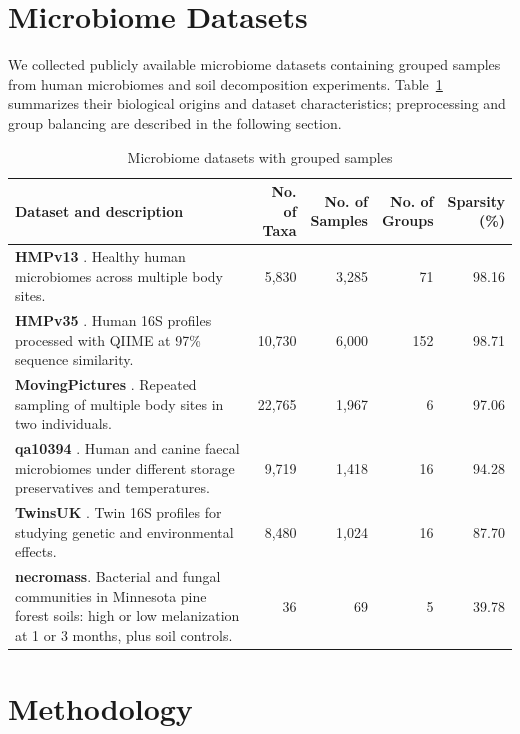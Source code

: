 \documentclass[]{Liebert_Author_revised}
\begin{document}
\section{Microbiome Datasets}
We collected publicly available microbiome datasets containing grouped samples from human microbiomes and soil decomposition experiments.
Table~\ref{tab:datasets} summarizes their biological origins and dataset characteristics; preprocessing and group balancing are described in the following section.

\begin{table}[t]
\centering
\caption{Microbiome datasets with grouped samples}
\label{tab:datasets}
\setlength{\tabcolsep}{4pt}
\begin{tabularx}{\textwidth}{@{}>{\raggedright\arraybackslash}X r r r r@{}}
\hline
Dataset and description & \shortstack{No. of\\Taxa} & \shortstack{No. of\\Samples} & \shortstack{No. of\\Groups} & \shortstack{Sparsity\\(\%)} \\
\hline
\textbf{HMPv13} \citep{HMP2012}. Healthy human microbiomes across multiple body sites. & 5,830 & 3,285 & 71 & 98.16 \\
\addlinespace[4pt]
\textbf{HMPv35} \citep{HMP2012,Huttenhower2012}. Human 16S profiles processed with QIIME at 97\% sequence similarity. & 10,730 & 6,000 & 152 & 98.71 \\
\addlinespace[4pt]
\textbf{MovingPictures} \citep{Caporaso2011}. Repeated sampling of multiple body sites in two individuals. & 22,765 & 1,967 & 6 & 97.06 \\
\addlinespace[4pt]
\textbf{qa10394} \citep{qa10394}. Human and canine faecal microbiomes under different storage preservatives and temperatures. & 9,719 & 1,418 & 16 & 94.28 \\
\addlinespace[4pt]
\textbf{TwinsUK} \citep{TwinsUK,Goodrich2016}. Twin 16S profiles for studying genetic and environmental effects. & 8,480 & 1,024 & 16 & 87.70 \\
\addlinespace[4pt]
\textbf{necromass}. Bacterial and fungal communities in Minnesota pine forest soils: high or low melanization at 1 or 3 months, plus soil controls. & 36 & 69 & 5 & 39.78 \\
\hline
\end{tabularx}
\end{table}

\section{Methodology}
\end{document}
